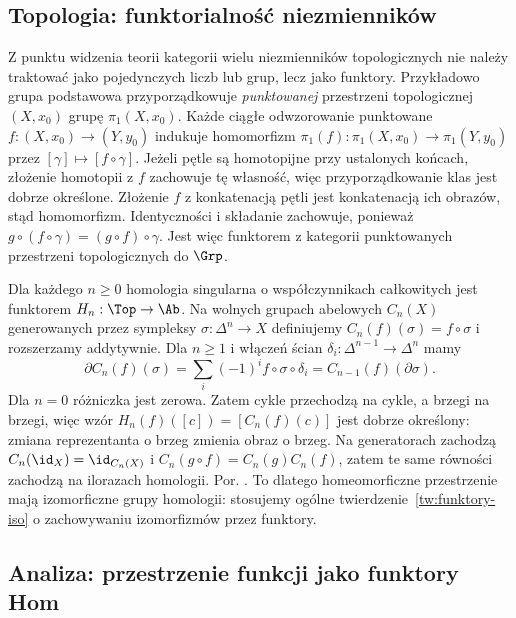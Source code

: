 \subsection{Topologia: funktorialność niezmienników}

Z punktu widzenia teorii kategorii wielu niezmienników topologicznych nie należy traktować jako pojedynczych liczb lub grup, lecz jako funktory. Przykładowo grupa podstawowa przyporządkowuje \emph{punktowanej} przestrzeni topologicznej $(X,x_0)$ grupę $\pi_1(X,x_0)$. Każde ciągłe odwzorowanie punktowane $f:(X,x_0)\to(Y,y_0)$ indukuje homomorfizm $\pi_1(f):\pi_1(X,x_0)\to\pi_1(Y,y_0)$ przez $[\gamma]\mapsto[f\circ\gamma]$. Jeżeli pętle są homotopijne przy ustalonych końcach, złożenie homotopii z $f$ zachowuje tę własność, więc przyporządkowanie klas jest dobrze określone. Złożenie $f$ z konkatenacją pętli jest konkatenacją ich obrazów, stąd homomorfizm. Identyczności i składanie zachowuje, ponieważ $g\circ(f\circ\gamma)=(g\circ f)\circ\gamma$. Jest więc funktorem z kategorii punktowanych przestrzeni topologicznych do $\Grp$.

\begin{przyklad}
Dla każdego $n\geq0$ homologia singularna o współczynnikach całkowitych jest funktorem $H_n:\Top\to\Ab$. Na wolnych grupach abelowych $C_n(X)$ generowanych przez sympleksy $\sigma:\Delta^n\to X$ definiujemy $C_n(f)(\sigma)=f\circ\sigma$ i rozszerzamy addytywnie. Dla $n\geq1$ i włączeń ścian $\delta_i:\Delta^{n-1}\to\Delta^n$ mamy
\[
\partial C_n(f)(\sigma)=\sum_i(-1)^i f\circ\sigma\circ\delta_i
=C_{n-1}(f)(\partial\sigma).
\]
Dla $n=0$ różniczka jest zerowa. Zatem cykle przechodzą na cykle, a brzegi na brzegi, więc wzór $H_n(f)([c])=[C_n(f)(c)]$ jest dobrze określony: zmiana reprezentanta o brzeg zmienia obraz o brzeg. Na generatorach zachodzą $C_n(\id_X)=\id_{C_n(X)}$ i $C_n(g\circ f)=C_n(g)C_n(f)$, zatem te same równości zachodzą na ilorazach homologii. Por. . To dlatego homeomorficzne przestrzenie mają izomorficzne grupy homologii: stosujemy ogólne twierdzenie~\ref{tw:funktory-iso} o zachowywaniu izomorfizmów przez funktory.
\end{przyklad}

\subsection{Analiza: przestrzenie funkcji jako funktory Hom}

